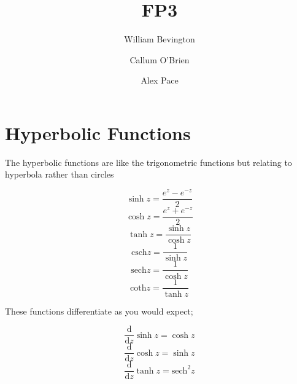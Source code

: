 \documentclass{article}
\title{FP3}
\author{William Bevington \and Callum O'Brien \and Alex Pace}
\begin{document}
\maketitle
\tableofcontents
\newpage

\section{Hyperbolic Functions}

The hyperbolic functions are like the trigonometric functions but relating to hyperbola rather than circles

\[\sinh z=\frac{e^z-e^{-z}}{2}\]
\[\cosh z=\frac{e^z+e^{-z}}{2}\]
\[\tanh z=\frac{\sinh z}{\cosh z}\]
\[\textrm{csch} z=\frac{1}{\sinh z}\]
\[\textrm{sech} z=\frac{1}{\cosh z}\]
\[\textrm{coth} z=\frac{1}{\tanh z}\]

\noindent These functions differentiate as you would expect;

\[\frac{\textrm{d}}{\textrm{d}z}\sinh z=\cosh z\]
\[\frac{\textrm{d}}{\textrm{d}z}\cosh z=\sinh z\]
\[\frac{\textrm{d}}{\textrm{d}z}\tanh z=\textrm{sech}^2 z\]
\end{document}
